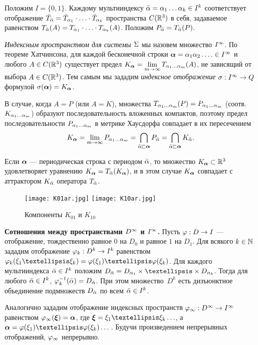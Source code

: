 Положим $I=\{0,1\}$. 
Каждому мультииндексу ${\bar{\alpha}}=\alpha_1\ldots\alpha_k\in I^k$  соответствует отображение $\tilde T_{\bar{\alpha}}={\tilde T}_{\alpha_1}\cdot\ldots\cdot{\tilde T}_{\alpha_k}$ пространства $C(\mathbb{R}^3)$ в себя, задаваемое равенством $ T_{\bar{\alpha}}(A)=T_{\alpha_1}\cdot\ldots\cdot T_{\alpha_k}(A)$. 
Положим $P_{\bar{\alpha}}=T_{\bar{\alpha}}(P).$

{\em Индексным пространством для системы $\Sigma$} мы назовем множество $I^\infty$. 
По теореме Хатчинсона, для каждой бесконечной строки ${\bm{\alpha}}=\alpha_1\alpha_2\ldots.\in I^\infty$  и любого $A\in C(\mathbb{R}^3)$ существует предел $K_{\bm{\alpha}}=\lim\limits_{m\to\infty}T_{\alpha_1\ldots\alpha_m}(A)$, не зависящий от выбора   $A\in C(\mathbb{R}^3)$. 
Тем самым  мы зададим {\em индексное отображение} $\sigma:I^\infty\to Q$ формулой $\sigma({\bm{\alpha}})=K_{\bm{\alpha}}$.

В случае, когда $A=P$ (или $A=K$), множества $T_{\alpha_1\ldots\alpha_m}(P)=P_{\alpha_1\ldots\alpha_m}$ (соотв. $K_{\alpha_1\ldots\alpha_m}$) образуют последовательность вложенных компактов, поэтому предел последовательности $P_{\alpha_1\ldots\alpha_m}$ в метрике Хаусдорфа совпадает в их пересечением
\begin{equation}\label{sigma} 
K_{\bm{\alpha}}=\lim\limits_{m\to\infty}P_{\alpha_1\ldots\alpha_m}=\bigcap\limits_{{\bar{\alpha}}\sqsubset {\bm{\alpha}}}P_{\bar{\alpha}}=\bigcap\limits_{{\bar{\alpha}}\sqsubset {\bm{\alpha}}}K_{\bar{\alpha}}.
\end{equation}

Если ${\bm{\alpha}}$ --- периодическая строка с периодом $\bar{\alpha}$, то множество $K_{\bm{\alpha}}\subset \mathbb{R}^3$ удовлетворяет уравнению $K_{\bm{\alpha}}=T_{\bar{\alpha}}(K_{\bm{\alpha}})$, и  в этом случае $K_{\bm{\alpha}}$ совпадает с аттрактором  $K_{\bar{\alpha}}$ оператора  $T_{\bar{\alpha}}$.


\begin{figure}[H]
\centering
\qquad\qquad
\texttt{[image: K01ar.jpg]}
\hfill
\texttt{[image: K10ar.jpg]}
\qquad\qquad
\caption{Компоненты $K_{01}$ и $K_{10}$}
\label{fig:5_4}
\end{figure}


{\bf Сотношения между пространствами $D^\infty$ и $I^\infty$.} Пусть $\varphi:D\to I$  ---  отображение, тождественно равное $0$ на   $D_0$ и равное $1$ на $D_1$. 
Для всякого $k\in\mathbb{N}$ зададим отображение $\varphi_k:D^k\to I^k$ равенством $\fy_k(\xi_1…\xi_k)=\fy(\xi_1)…\fy(\xi_k)$.
Для каждого мультииндекса  ${\bar{\alpha}}\in I^k$ положим $D_\bal=D_{\al_1}\times…\times D_{\al_k}$. 
Тогда для любого ${\bar{\alpha}}\in I^k$, $ \varphi_k^{-1}({\bar{\alpha}})=D_{\bar{\alpha}}$.
При этом множество~$D^k$ есть дизъюнктное объединение подмножеств $D_{\bar{\alpha}}$ по всем ${\bar{\alpha}}\in I^k$.

Аналогично зададим отображение индексных пространств $\varphi_\infty: D^\infty\to I^\infty$ равенством $\varphi_\infty({\bm{\xi}})={\bm{\alpha}}$, где  $\bmx=\xi_1…\xi_k\ldots$, а  $\bma=\fy(\xi_1)…\fy(\xi_k)\ldots$\,. 
Будучи произведением непрерывных отображений, $\varphi_\infty$ непрерывно.

